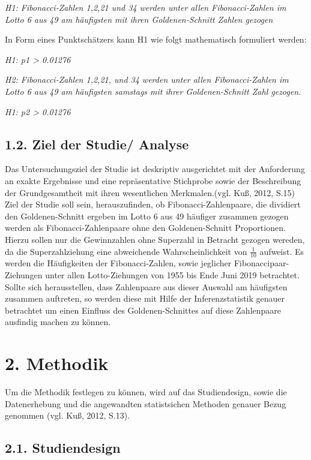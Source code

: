 \documentclass[ngerman,]{article}
\begin{document}
\emph{H1: Fibonacci-Zahlen 1,2,21 und 34 werden unter allen
Fibonacci-Zahlen im Lotto 6 aus 49 am häufigsten mit ihren
Goldenen-Schnitt Zahlen gezogen}

In Form eines Punktschätzers kann H1 wie folgt mathematisch formuliert
werden:

\emph{H1: p1 \textgreater{} 0.01276}

\emph{H2: Fibonacci-Zahlen 1,2,21, und 34 werden unter allen
Fibonacci-Zahlen im Lotto 6 aus 49 am häufigsten samstags mit ihrer
Goldenen-Schnitt Zahl gezogen.}

\emph{H1: p2 \textgreater{} 0.01276}

\subsection{1.2. Ziel der Studie/
Analyse}\label{ziel-der-studie-analyse}

Das Untersuchungsziel der Studie ist deskriptiv ausgerichtet mit der
Anforderung an exakte Ergebnisse und eine repräsentative Stichprobe
sowie der Beschreibung der Grundgesamtheit mit ihren wesentlichen
Merkmalen.(vgl. Kuß, 2012, S.15) Ziel der Studie soll sein,
herauszufinden, ob Fibonacci-Zahlenpaare, die dividiert den
Goldenen-Schnitt ergeben im Lotto 6 aus 49 häufiger zusammen gezogen
werden als Fibonacci-Zahlenpaare ohne den Goldenen-Schnitt Proportionen.
Hierzu sollen nur die Gewinnzahlen ohne Superzahl in Betracht gezogen
wereden, da die Superzahlziehung eine abweichende Wahrscheinlichkeit von
\(\frac{1}{10}\) aufweist. Es werden die Häufigkeiten der
Fibonacci-Zahlen, sowie jeglicher Fibonaccipaar-Ziehungen unter allen
Lotto-Ziehungen von 1955 bis Ende Juni 2019 betrachtet. Sollte sich
herausstellen, dass Zahlenpaare aus dieser Auswahl am häufigsten
zusammen auftreten, so werden diese mit Hilfe der Inferenzstatistik
genauer betrachtet um einen Einfluss des Goldenen-Schnittes auf diese
Zahlenpaare ausfindig machen zu können.

\section{2. Methodik}\label{methodik}

Um die Methodik festlegen zu können, wird auf das Studiendesign, sowie
die Datenerhebung und die angewandten statistsichen Methoden genauer
Bezug genommen (vgl. Kuß, 2012, S.13).

\subsection{2.1. Studiendesign}\label{studiendesign}
\end{document}
